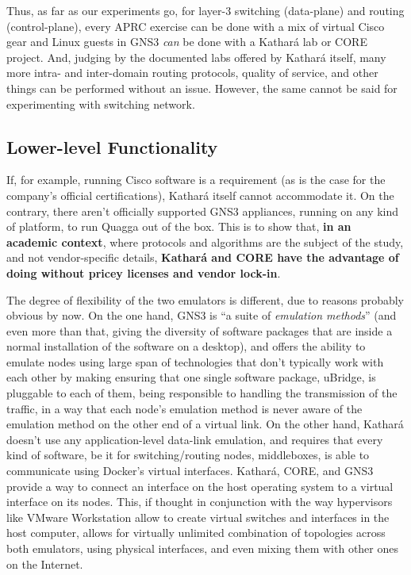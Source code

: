 Thus, as far as our experiments go, for layer-3 switching (data-plane) and routing (control-plane), every APRC exercise can be done with a mix of virtual Cisco gear and Linux guests in GNS3 \emph{can} be done with a Kathará lab or CORE project.
And, judging by the documented labs offered by Kathará itself, many more intra- and inter-domain routing protocols, quality of service, and other things can be performed without an issue.
However, the same cannot be said for experimenting with switching network. %

\subsection{Lower-level Functionality}

If, for example, running Cisco software is a requirement (as is the case for the company's official certifications), Kathará itself cannot accommodate it.
On the contrary, there aren't officially supported GNS3 appliances, running on any kind of platform, to run Quagga out of the box.
This is to show that, \textbf{in an academic context}, where protocols and algorithms are the subject of the study, and not vendor-specific details, \textbf{Kathará and CORE have the advantage of doing without pricey licenses and vendor lock-in}.

The degree of flexibility of the two emulators is different, due to reasons probably obvious by now.
On the one hand, GNS3 is ``a suite of \emph{emulation methods}'' (and even more than that, giving the diversity of software packages that are inside a normal installation of the software on a desktop), and offers the ability to emulate nodes using large span of technologies that don't typically work with each other by making ensuring that one single software package, uBridge, is pluggable to each of them, being responsible to handling the transmission of the traffic, in a way that each node's emulation method is never aware of the emulation method on the other end of a virtual link.
On the other hand, Kathará doesn't use any application-level data-link emulation, and requires that every kind of software, be it for switching/routing nodes, middleboxes, is able to communicate using Docker's virtual interfaces.
Kathará, CORE, and GNS3 provide a way to connect an interface on the host operating system to a virtual interface on its nodes.
This, if thought in conjunction with the way hypervisors like VMware Workstation allow to create virtual switches and interfaces in the host computer, allows for virtually unlimited combination of topologies across both emulators, using physical interfaces, and even mixing them with other ones on the Internet.

